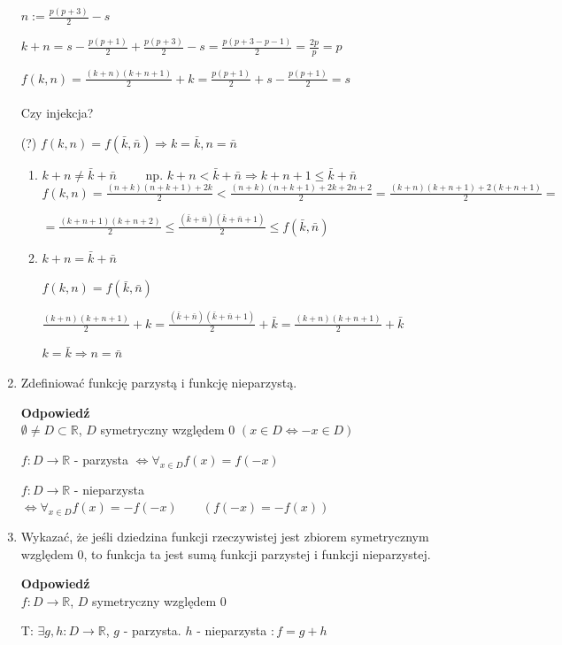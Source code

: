 \documentclass[12pt,a4paper]{article}
\theoremstyle{break}
\newcommand{\Odp}[1]{
		\begin{mdframed}[style=zadanie]
			\textbf{Odpowiedź}\\
			#1
		\end{mdframed}
	}
\begin{document}
\begin{enumerate}[1.]
{		$n:=\frac{p(p+3)}{2}-s$
	
		$k+n=s-\frac{p(p+1)}{2}+\frac{p(p+3)}{2}-s=\frac{p(p+3-p-1)}{2}=\frac{2p}{p}=p$
		
		$f(k,n)=\frac{(k+n)(k+n+1)}{2}+k=\frac{p(p+1)}{2}+s-\frac{p(p+1)}{2}=s$\\\\
		
		Czy injekcja?	
		
		(?) $f(k,n) = f(\bar{k},\bar{n})\Rightarrow k=\bar{k}, n=\bar{n}$
		
		\begin{enumerate}[1$^\circ$]
			\item $k+n\neq \bar{k}+\bar{n} \qquad$ np. $k+n<\bar{k}+\bar{n} \Rightarrow k+n+1\leq \bar{k}+\bar{n}$\\
			
			$f(k,n)=\frac{{(n+k)(n+k+1)}+2k}{2}< \frac{{(n+k)(n+k+1)}+2k+2n+2}{2} = \frac{(k+n)(k+n+1)+2(k+n+1)}{2}=$ 
			
			$=\frac{(k+n+1)(k+n+2)}{2}\leq \frac{(\bar{k}+\bar{n})(\bar{k}+\bar{n}+1)}{2}\leq f(\bar{k},\bar{n})$
			
			\item $k+n=\bar{k}+\bar{n}$
			
			$f(k,n)=f(\bar{k},\bar{n})$
			
			$\frac{(k+n)(k+n+1)}{2}+k=\frac{(\bar{k}+\bar{n})(\bar{k}+\bar{n}+1)}{2}+\bar{k}=\frac{(k+n)(k+n+1)}{2}+\bar{k}$
			
			$k=\bar{k} \Rightarrow n=\bar{n}$
		\end{enumerate}
	}
	\newpage
	\item Zdeﬁniować funkcję parzystą i funkcję nieparzystą.
	\Odp{
		$\emptyset\neq D \subset \mathbb{R}$, $D$ symetryczny względem $0$ $(x\in D\Leftrightarrow -x\in D)$
		
		$f:D\rightarrow\mathbb{R}$ - parzysta $\Leftrightarrow \forall_{x\in D} f(x)=f(-x)$
		
		$f:D\rightarrow\mathbb{R}$ - nieparzysta $\Leftrightarrow \forall_{x\in D} f(x)=-f(-x) \qquad (f(-x)=-f(x))$
	}
	
	\item Wykazać, że jeśli dziedzina funkcji rzeczywistej jest zbiorem symetrycznym względem 0, to funkcja ta jest sumą funkcji parzystej i funkcji nieparzystej.
	\Odp{
		$f:D\rightarrow \mathbb{R}$, $D$ symetryczny względem $0$
		
		T: $\exists g,h : D\rightarrow \mathbb{R}$, $g$ - parzysta. $h$ - nieparzysta $: f=g+h$
		
}
\end{enumerate}
\end{document}
